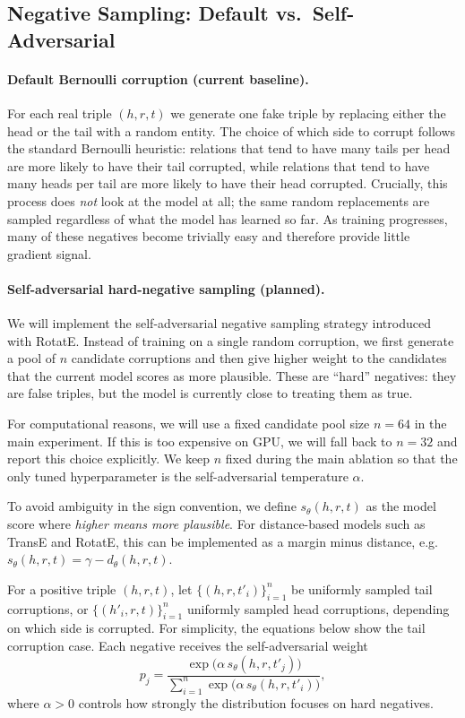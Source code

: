 \documentclass{llncs}
\begin{document}
\subsection{Negative Sampling: Default vs.\ Self-Adversarial}
\label{sec:hard-neg}

\paragraph{Default Bernoulli corruption (current baseline).}
For each real triple $(h,r,t)$ we generate one fake triple by replacing
either the head or the tail with a random entity.
The choice of which side to corrupt follows the standard Bernoulli
heuristic: relations that tend to have many tails per head are more likely
to have their tail corrupted, while relations that tend to have many heads
per tail are more likely to have their head corrupted.
Crucially, this process does \emph{not} look at the model at all; the
same random replacements are sampled regardless of what the model has
learned so far.
As training progresses, many of these negatives become trivially easy and
therefore provide little gradient signal.

\paragraph{Self-adversarial hard-negative sampling (planned).}
We will implement the self-adversarial negative sampling strategy
introduced with RotatE.
Instead of training on a single random corruption, we first generate a pool
of $n$ candidate corruptions and then give higher weight to the candidates
that the current model scores as more plausible.
These are ``hard'' negatives: they are false triples, but the model is
currently close to treating them as true.

For computational reasons, we will use a fixed candidate pool size
$n=64$ in the main experiment.
If this is too expensive on GPU, we will fall back to $n=32$ and report
this choice explicitly.
We keep $n$ fixed during the main ablation so that the only tuned
hyperparameter is the self-adversarial temperature $\alpha$.

To avoid ambiguity in the sign convention, we define
$s_\theta(h,r,t)$ as the model score where \emph{higher means more
plausible}.
For distance-based models such as TransE and RotatE, this can be
implemented as a margin minus distance, e.g.
$s_\theta(h,r,t)=\gamma-d_\theta(h,r,t)$.

For a positive triple $(h,r,t)$, let
$\{(h,r,t'_i)\}_{i=1}^n$ be uniformly sampled tail corruptions, or
$\{(h'_i,r,t)\}_{i=1}^n$ uniformly sampled head corruptions, depending on
which side is corrupted.
For simplicity, the equations below show the tail corruption case.
Each negative receives the self-adversarial weight
\begin{equation}
  p_j
  =
  \frac{
    \exp\!\bigl(\alpha\, s_\theta(h,r,t'_j)\bigr)
  }{
    \sum_{i=1}^{n}
    \exp\!\bigl(\alpha\, s_\theta(h,r,t'_i)\bigr)
  },
  \label{eq:sadv}
\end{equation}
where $\alpha>0$ controls how strongly the distribution focuses on hard
negatives.
\end{document}

